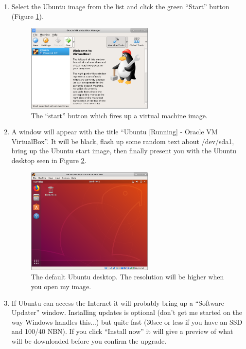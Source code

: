 \documentclass{lab}
\begin{document}
\begin{enumerate}
\item Select the Ubuntu image from the list and click the green ``Start'' button (Figure \ref{fig:virtualbox2}).
\begin{figure}[H]
\begin{center}
\includegraphics[width=0.6\textwidth]{Wk1Images/ubuntu_start.png}
\end{center}
\caption{The ``start'' button which fires up a virtual machine image.}\label{fig:virtualbox2}
\end{figure}

\item A window will appear with the title ``Ubuntu [Running] - Oracle VM VirtualBox''. It will be black, flash up some random text about /dev/sda1, bring up the Ubuntu start image, then finally present you with the Ubuntu desktop seen in Figure \ref{fig:virtualbox3}.

\begin{figure}[H]
\begin{center}
\includegraphics[width=0.6\textwidth]{Wk1Images/ubuntu_desktop.png}
\end{center}
\caption{The default Ubuntu desktop. The resolution will be higher when you open my image.}\label{fig:virtualbox3}
\end{figure}

\item If Ubuntu can access the Internet it will probably bring up a ``Software Updater'' window. Installing updates is optional (don't get me started on the way Windows handles this...) but quite fast (30sec or less if you have an SSD and 100/40 NBN). If you click ``Install now'' it will give a preview of what will be downloaded before you confirm the upgrade.


\end{enumerate}
\end{document}
